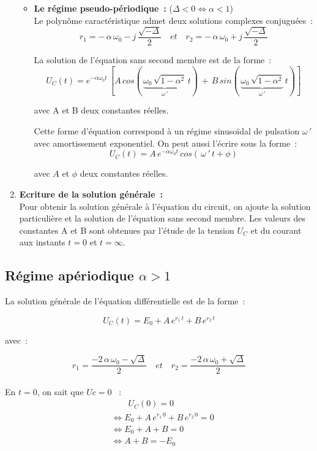 \begin{enumerate}
\begin{itemize}
		\bigskip
		\item \textbf{Le régime pseudo-périodique~:} ($\Delta < 0 \Leftrightarrow \alpha < 1$)\\	

			Le polynôme caractéristique admet deux solutions complexes conjuguées~:
			$$ r_1 =  -\,\alpha\,\omega_0 - j\,\dfrac{\sqrt{-\Delta}}{ 2 } \quad et \quad	r_2 = -\,\alpha\,\omega_0 + j\,\dfrac{\sqrt{-\Delta}}{ 2 }  $$

			La solution de l'équation sans second membre est de la forme~:
				$$U_C(t) = e^{-\alpha\omega_0t}\,\left[A\,cos(\,\underbrace{\omega_0\,\sqrt{1-\alpha^2}}_{\omega\,'}\,t)\,+\,B\,sin(\,\underbrace{\omega_0\,\sqrt{1-\alpha^2}}_{\omega\,'}\,t)\right]$$

				avec A et B deux constantes réelles. 

		Cette forme d'équation correspond à un régime sinusoïdal de pulsation $\omega\,'$ avec amortissement exponentiel. On peut aussi l'écrire sous la forme~:
$$ U_C(t) = A\,e^{-\alpha\omega_0t}\,cos(\,\omega\,'\,t + \phi)$$

	avec $A$ et $\phi$ deux constantes réelles. 
		\end{itemize}


	\item \textbf{Ecriture de la solution générale~:}\\

Pour obtenir la solution générale à l'équation du circuit, on ajoute la solution particulière et la solution de l'équation sans second membre. Les valeurs des constantes A et B sont obtenues par l'étude de la tension $U_C$ et du courant aux instants $t=0$ et $t=\infty$.

\end{enumerate}

\subsection*{Régime apériodique $\alpha > 1$}

La solution générale de l'équation différentielle est de la forme~:

$$U_C(t) = E_0 +  A\,e^{r_1\,t} + B\,e^{r_2\,t}$$

avec~:

$$ r_1 = \dfrac{ -2\,\alpha\,\omega_0 - \sqrt{\Delta}}{ 2 } \quad et \quad	r_2 = \dfrac{ -2\,\alpha\,\omega_0 + \sqrt{\Delta}}{ 2 }  $$ \\

En $t=0$, on sait que $Uc=0$ ~:
\begin{align*}
	& \qquad U_C(0) = 0 \\
	& \Leftrightarrow E_0 + A\,e^{r_1\,0} + B\,e^{r_2\,0} = 0 \\
	& \Leftrightarrow E_0 + A + B = 0 \\
	& \Leftrightarrow A + B = -E_0 
\end{align*}

